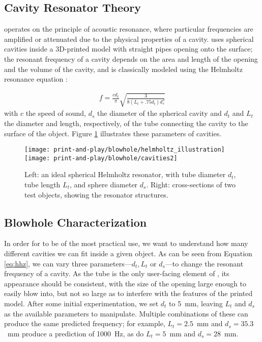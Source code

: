     \subsection{Cavity Resonator Theory}
      \bh operates on the principle of acoustic resonance, where particular
      frequencies are amplified or attenuated due to the physical properties of
      a cavity. \bh uses spherical cavities inside a 3D-printed model with
      straight pipes opening onto the surface; the resonant frequency of a
      cavity depends on the area and length of the opening and the volume of the
      cavity, and is classically modeled using the Helmholtz resonance equation
      \cite{Helmholtz:1885vp}:

      \begin{align}\label{eq:hhz}
        f = \frac{cd_t}{\pi}\sqrt{\frac{3}{8(L_t+.75 d_t)d_s^3}}
      \end{align}
      with $c$ the speed of sound, $d_s$ the diameter of the spherical cavity
      and $d_t$ and $L_t$ the diameter and length, respectively, of the tube
      connecting the cavity to the surface of the object. Figure \ref{fig:resonator}
      illustrates these parameters of \bh cavities.
      
      \begin{figure}
        \centering
        \texttt{[image: print-and-play/blowhole/helmholtz\_illustration]}
        \quad
        \texttt{[image: print-and-play/blowhole/cavities2]}
        \caption{Left: an ideal spherical Helmholtz resonator, with tube
          diameter $d_t$, tube length $L_t$, and sphere diameter $d_s$. Right:
          cross-sections of two \bh test objects, showing the resonator
          structures.}
        \label{fig:resonator}
      \end{figure}         

    \subsection{Blowhole Characterization} \label{sec:charac}
      In order for \bh to be of the most practical use, we want to understand
      how many different cavities we can fit inside a given object. As can be
      seen from Equation \ref{eq:hhz}, we can vary three parameters---$d_t, L_t$ or
      $d_s$---to change the resonant frequency of a \bh cavity. As the tube is
      the only user-facing element of \bh, its appearance should be consistent,
      with the size of the opening large enough to easily blow into, but not so
      large as to interfere with the features of the printed model. After some
      initial experimentation, we set $d_t$ to 5~mm, leaving $L_t$ and $d_s$ as
      the available parameters to manipulate. Multiple combinations of these can
      produce the same predicted frequency; for example, $L_t=2.5$~mm and
      $d_s=35.3$~mm produce a prediction of 1000~Hz, as do $L_t=5$~mm and
      $d_s=28$~mm.
      
